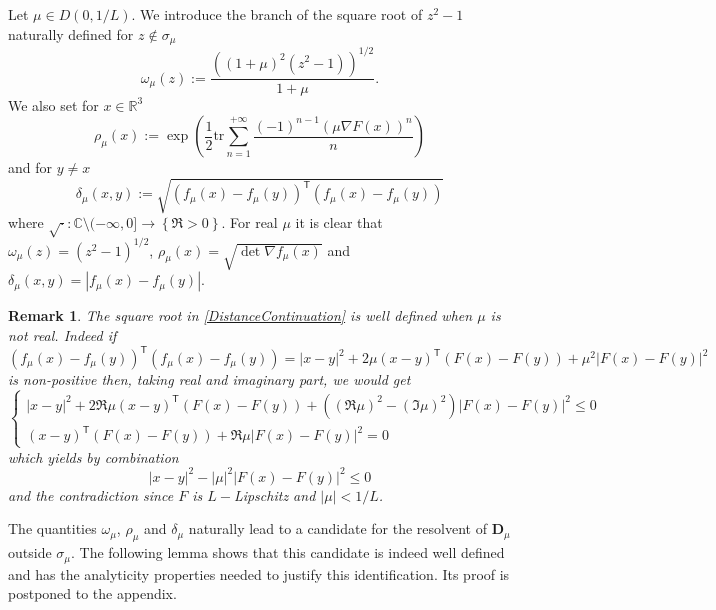 \documentclass[a4paper, 12pt]{amsart}
\numberwithin{equation}{section}
\newtheorem{remark}{Remark}[section]
\newcommand{\C}{\mathbb{C}} %
\newcommand{\R}{\mathbb{R}} %
\newcommand{\tr}{\mathrm{tr}} %
\newcommand{\lp}{\left(} %
\newcommand{\rp}{\right)} %
\newcommand{\lcb}{\left\lbrace} %
\newcommand{\rcb}{\right\rbrace} %
\newcommand{\lv}{\left\vert} %
\newcommand{\rv}{\right\vert} %
\newcommand{\Dvec}{\mathbf{D}}
\newcommand{\Tsf}{\mathsf{T}} %
\begin{document}
Let $\mu\in D(0,1/L)$. We introduce the branch of the square root of $z^2-1$ naturally defined for $z\not\in\sigma_\mu$
\begin{equation}\label{RotatedBranch}
    \omega_\mu(z):=\frac{\lp(1+\mu)^2(z^2-1)\rp^{1/2}}{1+\mu}.
\end{equation}
We also set for $x\in\R^3$
\begin{equation}\label{JacobianContinuation}
    \rho_\mu(x):=\exp\lp\frac{1}{2}\tr\sum_{n=1}^{+\infty}\frac{(-1)^{n-1}(\mu \nabla F(x))^n}{n}\rp
\end{equation}
and for $y\not=x$
\begin{equation}\label{DistanceContinuation}
    \delta_\mu(x,y):=\sqrt{(f_\mu(x)- f_\mu(y))^\Tsf(f_\mu(x)- f_\mu(y))}
\end{equation}
where $\sqrt{\cdot}:\C\setminus(-\infty,0]\rightarrow\lcb\Re>0\rcb$. For real $\mu$ it is clear that $\omega_\mu(z)=(z^2-1)^{1/2}$, $\rho_\mu(x)=\sqrt{\det \nabla f_\mu(x)}$ and $\delta_\mu(x,y)=\lv f_\mu(x)- f_\mu(y)\rv$.
\begin{remark}\label{SquareRootDefinition}
    The square root in \eqref{DistanceContinuation} is well defined when $\mu$ is not real. Indeed if
    \[(f_\mu(x)-f_\mu(y))^\Tsf(f_\mu(x)- f_\mu(y))=\lv x-y\rv^2+2\mu(x-y)^\Tsf(F(x)-F(y))+\mu^2\lv F(x)-F(y)\rv^2\]
    is non-positive then, taking real and imaginary part, we would get
    \begin{equation*}
        \left\{
        \begin{array}{ll}
            \lv x-y\rv^2+2\Re\mu(x-y)^\Tsf(F(x)-F(y))+\lp(\Re\mu)^2-(\Im\mu)^2\rp\lv F(x)-F(y)\rv^2\leq 0\\
            
            (x-y)^\Tsf(F(x)-F(y))+\Re\mu\lv F(x)-F(y)\rv^2=0
        \end{array}
        \right.
    \end{equation*}
    which yields by combination
    \[\lv x-y\rv^2-\lv\mu\rv^2\lv F(x)-F(y)\rv^2\leq0\]
    and the contradiction since $F$ is $L-$Lipschitz and $\lv\mu\rv<1/L$. 
\end{remark}

The quantities $\omega_\mu$, $\rho_\mu$ and $\delta_\mu$ naturally lead to a candidate for the resolvent of $\Dvec_\mu$ outside $\sigma_\mu$. The following lemma shows that this candidate is indeed well defined and has the analyticity properties needed to justify this identification. Its proof is postponed to the appendix.
\end{document}
